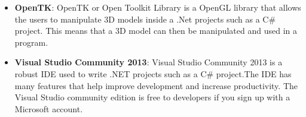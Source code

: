 \begin{itemize}
		\item \textbf{OpenTK}: OpenTK or Open Toolkit Library is a OpenGL library that allows the users to manipulate 3D models inside a .Net projects such as a C\# project. This means that a 3D model can then be manipulated and used in a program.
		
		\item \textbf{Visual Studio Community 2013}: Visual Studio Community 2013 is a robust IDE used to write .NET projects such as a C\#  project.The IDE has many features that help improve development and increase productivity. The Visual Studio community edition is free to developers if you sign up with a Microsoft account.
\end{itemize}